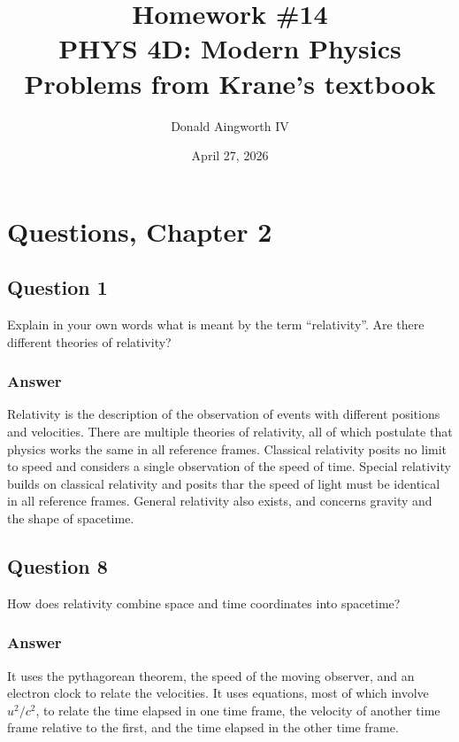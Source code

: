 \documentclass[12pt]{article}
\title{
    Homework \#14
    \\  \small
    PHYS 4D: Modern Physics
    \\
    Problems from Krane's textbook
    }
\author{Donald Aingworth IV}
\date{April 27, 2026}
\begin{document}
\maketitle
{}

\section{Questions, Chapter 2}
    \subsection{Question 1}
        Explain in your own words what is meant by the term ``relativity''. 
        Are there different theories of relativity?

        \subsubsection{Answer}
            Relativity is the description of the observation of events with different positions and velocities.
            There are multiple theories of relativity, all of which postulate that physics works the same in all reference frames.
            Classical relativity posits no limit to speed and considers a single observation of the speed of time.
            Special relativity builds on classical relativity and posits thar the speed of light must be identical in all reference frames.
            General relativity also exists, and concerns gravity and the shape of spacetime.
        \pagebreak

    \subsection{Question 8}
        How does relativity combine space and time coordinates into spacetime?
        
        \subsubsection{Answer}
            It uses the pythagorean theorem, the speed of the moving observer, and an electron clock to relate the velocities.
            It uses equations, most of which involve $u^2/c^2$, to relate the time elapsed in one time frame, the velocity of another time frame relative to the first, and the time elapsed in the other time frame.
\end{document}
